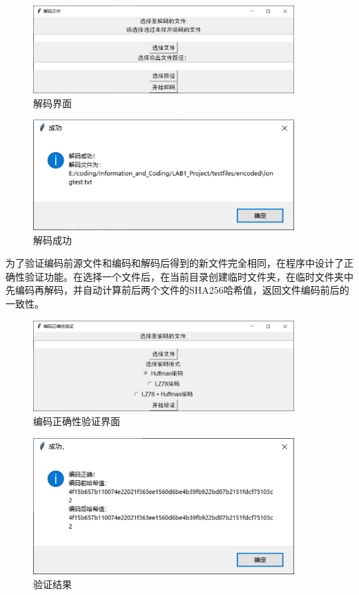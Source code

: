 \documentclass[12pt, a4paper]{ctexart}
\begin{document}
    \begin{figure}[H]
    \centering
    \includegraphics[width=10cm]{./pic/4-4.png}		
    \caption{解码界面}
    \end{figure}
    \begin{figure}[H]
    \centering
    \includegraphics[width=10cm]{./pic/4-5.png}		
    \caption{解码成功}
    \end{figure}

    为了验证编码前源文件和编码和解码后得到的新文件完全相同，在程序中设计了正确性验证功能。在选择一个文件后，在当前目录创建临时文件夹，在临时文件夹中先编码再解码，并自动计算前后两个文件的SHA256哈希值，返回文件编码前后的一致性。
    
    \begin{figure}[H]
    \centering
    \includegraphics[width=10cm]{./pic/4-6.png}		
    \caption{编码正确性验证界面}
    \end{figure}
    \begin{figure}[H]
    \centering
    \includegraphics[width=10cm]{./pic/4-7.png}		
    \caption{验证结果}
    \end{figure}
\end{document}

